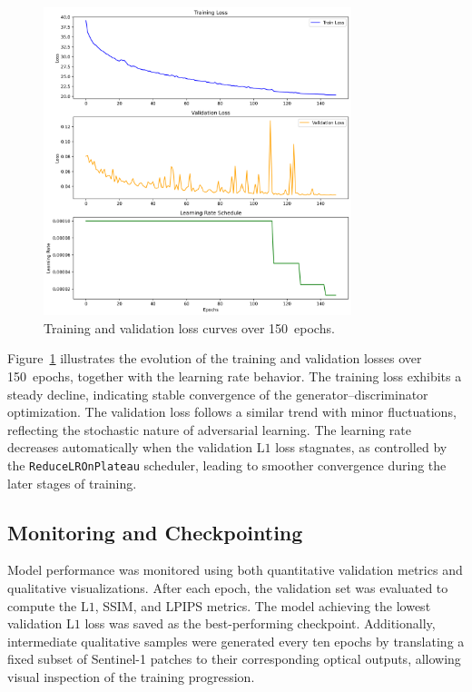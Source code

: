 \begin{figure}[!htbp]
    \centering
    \includegraphics[width=0.8\textwidth,height=0.65\textheight]{img/training_curves.png}
    \caption{Training and validation loss curves over 150~epochs.}
    \label{fig:training_curve}
\end{figure}

Figure~\ref{fig:training_curve} illustrates the evolution of the training and validation losses over 150~epochs, together with the learning rate behavior. The training loss exhibits a steady decline, indicating stable convergence of the generator–discriminator optimization. The validation loss follows a similar trend with minor fluctuations, reflecting the stochastic nature of adversarial learning. The learning rate decreases automatically when the validation $\mathrm{L1}$ loss stagnates, as controlled by the \texttt{ReduceLROnPlateau} scheduler, leading to smoother convergence during the later stages of training.

\subsection{Monitoring and Checkpointing}
Model performance was monitored using both quantitative validation metrics and qualitative visualizations. After each epoch, the validation set was evaluated to compute the $\mathrm{L1}$, SSIM, and LPIPS metrics. The model achieving the lowest validation $\mathrm{L1}$ loss was saved as the best-performing checkpoint. Additionally, intermediate qualitative samples were generated every ten epochs by translating a fixed subset of Sentinel-1 patches to their corresponding optical outputs, allowing visual inspection of the training progression.

